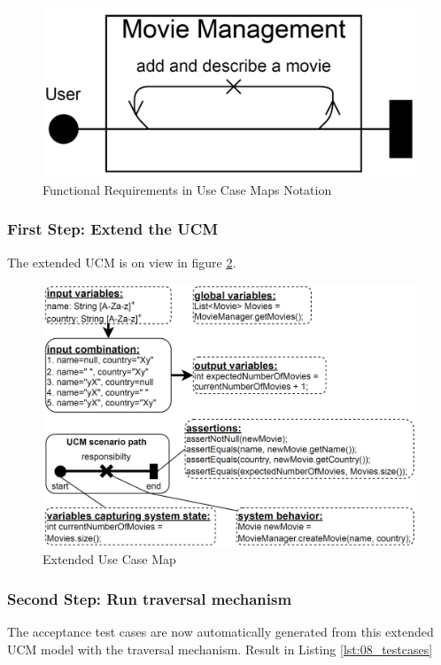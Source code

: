 \begin{figure}[h]
	\centering
	\includegraphics[scale=0.3]{../images/08/08_UCMAddAndDescribeMovie.jpg} 
	\caption{Functional Requirements in Use Case Maps Notation}
	\label{fig:08_UCMAddAndDescribeMovie}
\end{figure}
\newpage
\subsubsection{First Step: Extend the UCM}
The extended UCM is on view in figure \ref{fig:08_UCMExtended}.

\begin{figure}[h]
	\centering
	\includegraphics[scale=0.5]{../images/08/08_UCMExtended.jpg} 
	\caption{Extended Use Case Map}
	\label{fig:08_UCMExtended}
\end{figure}

\subsubsection{Second Step: Run traversal mechanism}
The acceptance test cases are now automatically generated from this extended UCM model with the traversal mechanism. Result in Listing \ref{lst:08_testcases}


